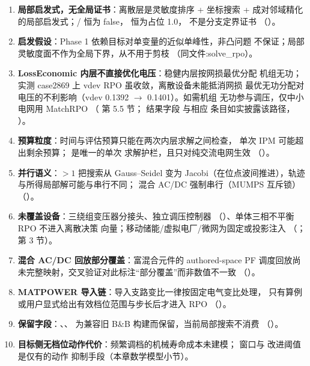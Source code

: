 \begin{enumerate}
  \item \textbf{局部启发式，无全局证书}：离散层是灵敏度排序 + 坐标搜索 +
        成对邻域精化的局部启发式；/
         恒为 false， 恒为占位
        1.0， 不是分支定界证书
        （）。
  \item \textbf{启发假设}：Phase 1 依赖目标对单变量的近似单峰性，非凸问题
        不保证；局部灵敏度面不作为全局下界，从不用于剪枝
        （同文件:solve\_rpo）。
  \item \textbf{LossEconomic 内层不直接优化电压}：稳健内层按网损最优分配
        机组无功；实测 case2869 上 vdev RPO 虽收敛，离散设备未能抵消网损
        最优无功分配对电压的不利影响（vdev 0.1392 $\to$ 0.1401）。如需机组
        无功参与调压，仅中小电网用 MatchRPO
        （ 第 5.5 节；
        结果字段  与相应
         条目如实披露该路径，
        ）。
  \item \textbf{预算粒度}：时间与评估预算只能在两次内层求解之间检查，
        单次 IPM 可能超出剩余预算； 是唯一的单次
        求解护栏，且只对纯交流电网生效
        （）。
  \item \textbf{并行语义}：$>1$ 把搜索从 Gauss--Seidel
        变为 Jacobi（在位点波间推进），轨迹与所得局部解可能与串行不同；
        混合 AC/DC 强制串行（MUMPS 互斥锁）
        （）。
  \item \textbf{未覆盖设备}：三绕组变压器分接头、独立调压控制器
        （）、单体三相不平衡 RPO 不进入离散决策
        向量；移动储能/虚拟电厂/微网为固定或投影注入
        （；
         第 3 节）。
  \item \textbf{混合 AC/DC 回放部分覆盖}：富混合元件的 authored-space PF
        调度回放尚未完整映射，交叉验证对此标注“部分覆盖”而非数值不一致
        （）。
  \item \textbf{MATPOWER 导入链}：导入支路变比一律按固定电气变比处理，
        只有算例或用户显式给出有效档位范围与步长后才进入 RPO
        （）。
  \item \textbf{保留字段}：、、
        为兼容旧 B\&B 构建而保留，当前局部搜索不消费
        （）。
  \item \textbf{目标侧无档位动作代价}：频繁调档的机械寿命成本未建模；
         窗口与  改进阈值是仅有的动作
        抑制手段（本章数学模型小节）。
\end{enumerate}
